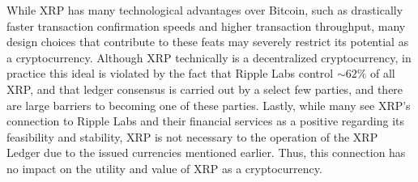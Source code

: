 \documentclass[11pt,a4paper]{article}
\begin{document}
	While XRP has many technological advantages over Bitcoin, such as drastically faster transaction confirmation speeds and higher transaction throughput, many design choices that contribute to these feats may severely restrict its potential as a cryptocurrency. Although XRP technically is a decentralized cryptocurrency, in practice this ideal is violated by the fact that Ripple Labs control $\sim62\%$ of all XRP, and that ledger consensus is carried out by a select few parties, and there are large barriers to becoming one of these parties. Lastly, while many see XRP's connection to Ripple Labs and their financial services as a positive regarding its feasibility and stability, XRP is not necessary to the operation of the XRP Ledger due to the issued currencies mentioned earlier. Thus, this connection has no impact on the utility and value of XRP as a cryptocurrency.
	
	
	
\end{document}
